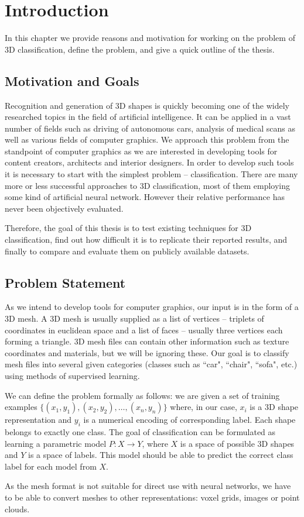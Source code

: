 \chapter{Introduction}
\label{sec:chap1}
In this chapter we provide reasons and motivation for working on the problem of 3D classification, define the problem, and give a quick outline of the thesis.

\section{Motivation and Goals}
Recognition and generation of 3D shapes is quickly becoming one of the widely researched topics in the field of artificial intelligence. It can be applied in a vast number of fields such as driving of autonomous cars, analysis of medical scans as well as various fields of computer graphics. We approach this problem from the standpoint of computer graphics as we are interested in developing tools for content creators, architects and interior designers. In order to develop such tools it is necessary to start with the simplest problem -- classification. 
There are many more or less successful approaches to 3D classification, most of them employing some kind of artificial neural network. However their relative performance has never been objectively evaluated.\par
Therefore, the goal of this thesis is to test existing techniques for 3D classification, find out how difficult it is to replicate their reported results, and finally to compare and evaluate them on publicly available datasets.
\section{Problem Statement}
\label{sec:problemstatement}
As we intend to develop tools for computer graphics, our input is in the form of a 3D mesh. A 3D mesh is usually supplied as a list of vertices -- triplets of coordinates in euclidean space and a list of faces -- usually three vertices each forming a triangle. 3D mesh files can contain other information such as texture coordinates and materials, but we will be ignoring these. Our goal is to classify mesh files into several given categories (classes such as ``car", ``chair", ``sofa", etc.) using methods of supervised learning.\par
We can define the problem formally as follows: we are given a set of training examples $\{(x_1,y_1),(x_2,y_2),\ldots, (x_n,y_n)\}$ where, in our case, $x_i$ is a 3D shape representation and $y_i$ is a numerical encoding of corresponding label. Each shape belongs to exactly one class. The goal of classification can be formulated as learning a parametric model $P:X \rightarrow Y$,  where $X$ is a space of possible 3D shapes and $Y$ is a space of labels. This model should be able to predict the correct class label for each model from $X$. \par
As the mesh format is not suitable for direct use with neural networks, we have to be able to convert meshes to other representations: voxel grids, images or point clouds.
